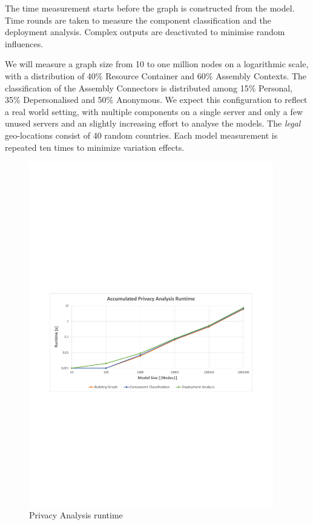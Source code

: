 The time measurement starts before the graph is constructed from the model. Time rounds are taken to measure the component classification and the deployment analysis. Complex outputs are deactivated to minimise random influences.

We will measure a graph size from 10 to one million nodes on a logarithmic scale, with a distribution of 40\% Resource Container and 60\% Assembly Contexts. The classification of the Assembly Connectors is distributed among 15\% Personal, 35\% Depersonalised and 50\% Anonymous. We expect this configuration to reflect a real world setting, with multiple components on a single server and only a few unused servers and an slightly increasing effort to analyse the models. The \textit{legal} geo-locations consist of 40 random countries. Each model measurement is repeated ten times to minimize variation effects.

\begin{figure}[h]
	\centering
	\includegraphics[trim = 15mm 95mm 13mm 110mm, clip, width=0.95\textwidth]{graphs/Runtime_pa}
	\caption{Privacy Analysis runtime}
	\label{fig:eval:pa:runtime}
\end{figure}


